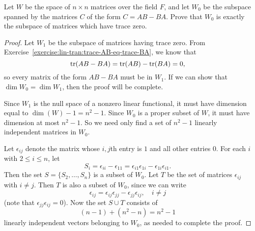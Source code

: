  Let $W$ be the space of $n\times n$ matrices over the
field $F$, and let $W_0$ be the subspace spanned by the matrices $C$
of the form $C = AB - BA$. Prove that $W_0$ is exactly the subspace of
matrices which have trace zero.
\begin{proof}
  Let $W_1$ be the subspace of matrices having trace zero. From
  Exercise~\ref{exercise:lin-tran:trace-AB-eq-trace-BA}, we know that
  \begin{equation*}
    \operatorname{tr}(AB - BA) = \operatorname{tr}(AB) - \operatorname{tr}(BA) = 0,
  \end{equation*}
  so every matrix of the form $AB - BA$ must be in $W_1$. If we can
  show that $\dim W_0 = \dim W_1$, then the proof will be complete.

  Since $W_1$ is the null space of a nonzero linear functional, it
  must have dimension equal to $\dim(W) - 1 = n^2 - 1$. Since $W_0$ is
  a proper subset of $W$, it must have dimension at most $n^2 - 1$. So
  we need only find a set of $n^2 - 1$ linearly independent matrices
  in $W_0$.

  Let $\epsilon_{ij}$ denote the matrix whose $i,j$th entry is $1$ and
  all other entries $0$. For each $i$ with $2\leq i\leq n$, let
  \begin{equation*}
    S_i = \epsilon_{ii} - \epsilon_{11} = \epsilon_{i1}\epsilon_{1i}
    - \epsilon_{1i}\epsilon_{i1}.
  \end{equation*}
  Then the set $S = \{S_2,\dots,S_n\}$ is a subset of $W_0$. Let $T$
  be the set of matrices $\epsilon_{ij}$ with $i\neq j$. Then $T$ is
  also a subset of $W_0$, since we can write
  \begin{equation*}
    \epsilon_{ij} = \epsilon_{ij}\epsilon_{jj}
    - \epsilon_{jj}\epsilon_{ij}, \quad i\neq j
  \end{equation*}
  (note that $\epsilon_{jj}\epsilon_{ij} = 0$). Now the set $S\cup T$
  consists of
  \begin{equation*}
    (n - 1) + (n^2 - n) = n^2 - 1
  \end{equation*}
  linearly independent vectors belonging to $W_0$, as needed to
  complete the proof.
\end{proof}
